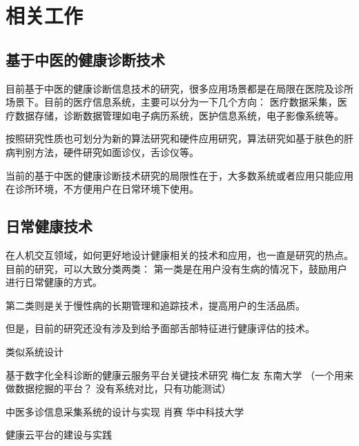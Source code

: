 \chapter{相关工作}

\section{基于中医的健康诊断技术}

目前基于中医的健康诊断信息技术的研究，很多应用场景都是在局限在医院及诊所场景下。目前的医疗信息系统，主要可以分为一下几个方向：
医疗数据采集，医疗数据存储，诊断数据管理如电子病历系统，医护信息系统，电子影像系统等。

按照研究性质也可划分为新的算法研究和硬件应用研究，算法研究如基于肤色的肝病判别方法，硬件研究如面诊仪，舌诊仪等。


当前的基于中医的健康诊断技术研究的局限性在于，大多数系统或者应用只能应用在诊所环境，不方便用户在日常环境下使用。

\section{日常健康技术}

在人机交互领域，如何更好地设计健康相关的技术和应用，也一直是研究的热点。目前的研究，可以大致分类两类： 第一类是在用户没有生病的情况下，鼓励用户进行日常健康的方式。

第二类则是关于慢性病的长期管理和追踪技术，提高用户的生活品质。






但是，目前的研究还没有涉及到给予面部舌部特征进行健康评估的技术。






类似系统设计

基于数字化全科诊断的健康云服务平台关键技术研究 梅仁友 东南大学 （一个用来做数据挖掘的平台？  没有系统对比，只有功能测试）

中医多诊信息采集系统的设计与实现 肖赛 华中科技大学

健康云平台的建设与实践

